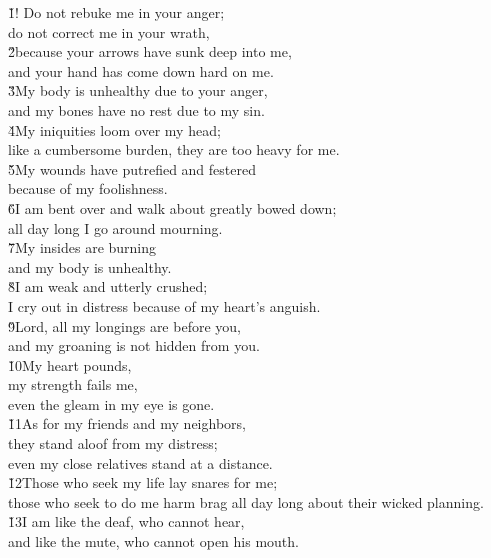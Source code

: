 \begin{poetry}
\poeml \v{1}! Do not rebuke me in your anger; \\
\poemll    do not correct me in your wrath, \\
\poeml \v{2}because your arrows have sunk deep into me, \\
\poemll    and your hand has come down hard on me. \\
\poeml \v{3}My body is unhealthy due to your anger, \\
\poemll    and my bones have no rest due to my sin. \\
\poeml \v{4}My iniquities loom over my head; \\
\poemll    like a cumbersome burden, they are too heavy for me. \\
\poeml \v{5}My wounds have putrefied and festered \\
\poemll    because of my foolishness. \\
\poeml \v{6}I am bent over and walk about greatly bowed down; \\
\poemll    all day long I go around mourning. \\
\poeml \v{7}My insides are burning \\
\poemll    and my body is unhealthy. \\
\poeml \v{8}I am weak and utterly crushed; \\
\poemll    I cry out in distress because of my heart's anguish. \\
\poeml \v{9}Lord, all my longings are before you, \\
\poemll    and my groaning is not hidden from you. \\
\poeml \v{10}My heart pounds, \\
\poemll    my strength fails me, \\
\poemlll       even the gleam in my eye is gone. \\
\poeml \v{11}As for my friends and my neighbors, \\
\poemll    they stand aloof from my distress; \\
\poemlll       even my close relatives stand at a distance. \\
\poeml \v{12}Those who seek my life lay snares for me; \\
\poemll    those who seek to do me harm brag all day long about their wicked planning. \\
\poeml \v{13}I am like the deaf, who cannot hear, \\
\poemll    and like the mute, who cannot open his mouth. \\

\end{poetry}

